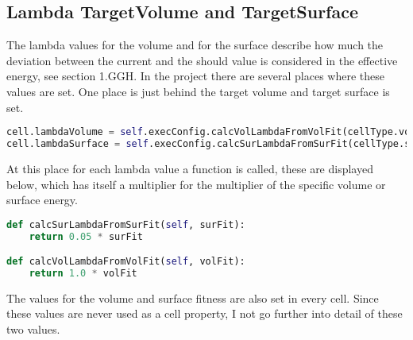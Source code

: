\subsection{Lambda TargetVolume and TargetSurface}
The lambda values for the volume and for the surface describe how much the deviation between the current and the should value is considered in the effective energy, see section 1.GGH.
In the project there are several places where these values are set. One place is just behind the target volume and target surface is set.
\begin{lstlisting}[language=Python, caption = set lambda volume and lambda surface]
cell.lambdaVolume = self.execConfig.calcVolLambdaFromVolFit(cellType.volFit)
cell.lambdaSurface = self.execConfig.calcSurLambdaFromSurFit(cellType.surFit)
\end{lstlisting}
At this place for each lambda value a function is called, these are displayed below, which has itself a multiplier for the multiplier of the specific volume or surface energy.
\begin{lstlisting}[language=Python, caption = functions to calculate the lambda multiplier for the effective energy of the volume and surface]
def calcSurLambdaFromSurFit(self, surFit):
    return 0.05 * surFit

def calcVolLambdaFromVolFit(self, volFit):
	return 1.0 * volFit
\end{lstlisting}

The values for the volume and surface fitness are also set in every cell. Since these values are never used as a cell property, I not go further into detail of these two values.






